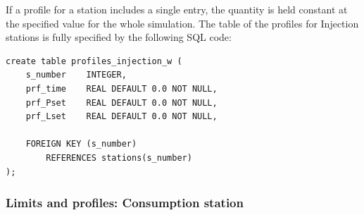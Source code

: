 If a profile for a station includes a single entry, the quantity is held constant
at the specified value for the whole simulation. The table of the profiles for
Injection stations is fully specified by the following SQL code:
\begin{verbatim}
create table profiles_injection_w (
    s_number    INTEGER,
    prf_time    REAL DEFAULT 0.0 NOT NULL,
    prf_Pset    REAL DEFAULT 0.0 NOT NULL,
    prf_Lset    REAL DEFAULT 0.0 NOT NULL,

    FOREIGN KEY (s_number)
        REFERENCES stations(s_number)
);
\end{verbatim}

\subsubsection{Limits and profiles: Consumption station}

